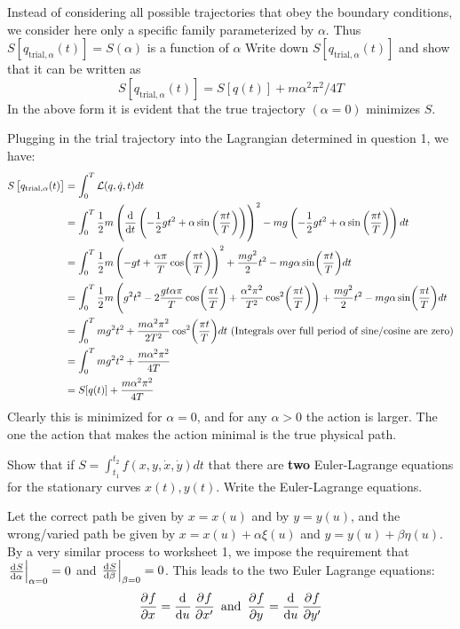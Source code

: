 \documentclass[../PHYS306Notes.tex]{subfiles}
\begin{document}
\begin{p}
Instead of considering all possible trajectories that obey the boundary conditions, we consider here only a specific family parameterized by $\alpha .$ Thus $S\left[q_{\text {trial}, \alpha}(t)\right]=S(\alpha)$ is a function of $\alpha$ Write down $S\left[q_{\text {trial}, \alpha}(t)\right]$ and show that it can be written as
\[ S\left[q_{\text {trial}, \alpha}(t)\right]=S[q(t)]+m \alpha^{2} \pi^{2} / 4 T \]
In the above form it is evident that the true trajectory $(\alpha=0)$ minimizes $S$.
\end{p}
\begin{s}
Plugging in the trial trajectory into the Lagrangian determined in question 1, we have:
\begin{align*}
S\left[q_{\text {trial}, \alpha}(t)\right] &= \int_{0}^T \LL(q,\dot{q}, t)dt
\\ &= \int_{0}^T\frac{1}{2}m\left(\dod{}{t}\left(-\frac{1}{2} g t^{2}+\alpha \sin \left(\frac{\pi t}{T}\right)\right)\right)^2 - mg\left(-\frac{1}{2} g t^{2}+\alpha \sin \left(\frac{\pi t}{T}\right)\right)dt
\\ &= \int_{0}^T\frac{1}{2}m\left(-gt + \frac{\alpha \pi}{T}\cos(\frac{\pi t}{T})\right)^2 + \frac{mg^2}{2}t^2 - mg\alpha\sin(\frac{\pi t}{T}) dt
\\ &= \int_0^T \frac{1}{2}m\left(g^2t^2 - 2\frac{gt\alpha\pi}{T}\cos(\frac{\pi t}{T}) + \frac{\alpha^2\pi^2}{T^2}\cos[2](\frac{\pi t}{T})\right) + \frac{mg^2}{2}t^2 - mg\alpha\sin(\frac{\pi t}{T}) dt
\\ &= \int_0^T mg^2t^2 + \frac{m\alpha^2\pi^2}{2T^2}\cos[2](\frac{\pi t}{T}) dt \text{ (Integrals over full period of sine/cosine are zero)}
\\ &= \int_0^T mg^2t^2 + \frac{m\alpha^2 \pi^2}{4T}
\\ &= S[q(t)] + \frac{m\alpha^2 \pi^2}{4T}
\end{align*}
Clearly this is minimized for $\alpha = 0$, and for any $\alpha > 0$ the action is larger. The one the action that makes the action minimal is the true physical path.
\end{s}

\begin{p}
Show that if $S = \int_{t_1}^{t_2} f(x, y, \dot{x}, \dot{y}) dt$ that there are \textbf{two} Euler-Lagrange equations for the stationary curves $x(t), y(t)$. Write the Euler-Lagrange equations.
\end{p}
\begin{s}
Let the correct path be given by $x = x(u)$ and by $y = y(u)$, and the wrong/varied path be given by $x = x(u) + \alpha\xi(u)$ and $y = y(u) + \beta\eta(u)$. By a very similar process to worksheet 1, we impose the requirement that $\left. \od{S}{\alpha}\right|_{\alpha = 0} = 0$ and $\left. \od{S}{\beta}\right|_{\beta = 0} = 0$. This leads to the two Euler Lagrange equations:
\[\dpd{f}{x} = \dod{}{u}\dpd{f}{x'} \text{ and } \dpd{f}{y} = \dod{}{u}\dpd{f}{y'}\]
\end{s}
\end{document}
